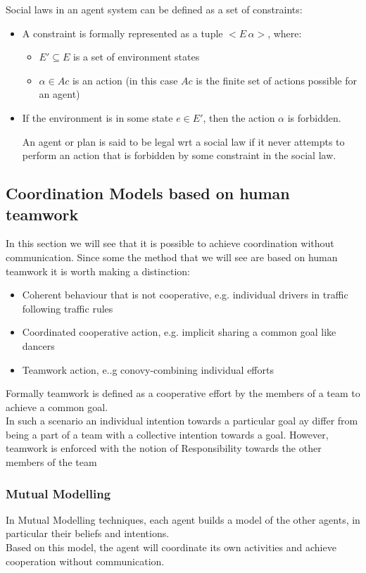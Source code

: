 Social laws in an agent system can be defined as a set of constraints:
\begin{itemize}
\item A constraint is formally represented as a tuple $<E\, \alpha>$, where:
\begin{itemize}
\item $E' \subseteq E$ is a set of environment states
\item $\alpha \in Ac$ is an action (in this case $Ac$ is the finite set of actions possible for an agent)
\end{itemize}
\item If the environment is in some state $e \in E'$, then the action $\alpha$ is forbidden.

An agent or plan is said to be legal wrt a social law if it never attempts to perform an action that is forbidden by some constraint in the social law.
\end{itemize}

\subsection{Coordination Models based on human teamwork}
In this section we will see that it is possible to achieve coordination without communication. Since some the method that we will see are based on human teamwork it is worth making a distinction:
\begin{itemize}
\item Coherent behaviour that is not cooperative, e.g. individual drivers in traffic following traffic rules
\item Coordinated cooperative action, e.g. implicit sharing a common goal like dancers
\item Teamwork action, e..g conovy-combining individual efforts
\end{itemize}
Formally teamwork is defined as a cooperative effort by the members of a team to achieve a common goal.\\
 In such a scenario an individual intention towards a particular goal ay differ from being a part of a team with a collective intention towards a goal.
 However, teamwork is enforced with the notion of Responsibility towards the other members of the team
\subsubsection{Mutual Modelling}
In Mutual Modelling techniques, each agent builds a model of the other agents, in particular their beliefs and intentions.\\
Based on this model, the agent will coordinate its own activities and achieve cooperation without communication.

